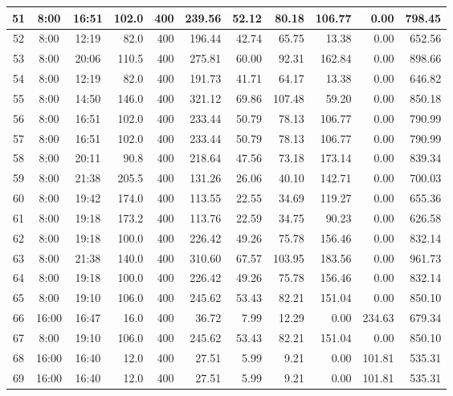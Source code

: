 \begin{landscape}
\begin{longtable}{|c|c|c|r|r|r|r|r|r|r|r|}
\hline
\rowcolor{gray!8}
51 & 8:00 & 16:51 & 102.0 & 400 & 239.56 & 52.12 & 80.18 & 106.77 & 0.00 & 798.45 \\
\hline
52 & 8:00 & 12:19 & 82.0 & 400 & 196.44 & 42.74 & 65.75 & 13.38 & 0.00 & 652.56 \\
\hline
\rowcolor{gray!8}
53 & 8:00 & 20:06 & 110.5 & 400 & 275.81 & 60.00 & 92.31 & 162.84 & 0.00 & 898.66 \\
\hline
54 & 8:00 & 12:19 & 82.0 & 400 & 191.73 & 41.71 & 64.17 & 13.38 & 0.00 & 646.82 \\
\hline
\rowcolor{gray!8}
55 & 8:00 & 14:50 & 146.0 & 400 & 321.12 & 69.86 & 107.48 & 59.20 & 0.00 & 850.18 \\
\hline
56 & 8:00 & 16:51 & 102.0 & 400 & 233.44 & 50.79 & 78.13 & 106.77 & 0.00 & 790.99 \\
\hline
\rowcolor{gray!8}
57 & 8:00 & 16:51 & 102.0 & 400 & 233.44 & 50.79 & 78.13 & 106.77 & 0.00 & 790.99 \\
\hline
58 & 8:00 & 20:11 & 90.8 & 400 & 218.64 & 47.56 & 73.18 & 173.14 & 0.00 & 839.34 \\
\hline
\rowcolor{gray!8}
59 & 8:00 & 21:38 & 205.5 & 400 & 131.26 & 26.06 & 40.10 & 142.71 & 0.00 & 700.03 \\
\hline
60 & 8:00 & 19:42 & 174.0 & 400 & 113.55 & 22.55 & 34.69 & 119.27 & 0.00 & 655.36 \\
\hline
\rowcolor{gray!8}
61 & 8:00 & 19:18 & 173.2 & 400 & 113.76 & 22.59 & 34.75 & 90.23 & 0.00 & 626.58 \\
\hline
62 & 8:00 & 19:18 & 100.0 & 400 & 226.42 & 49.26 & 75.78 & 156.46 & 0.00 & 832.14 \\
\hline
\rowcolor{gray!8}
63 & 8:00 & 21:38 & 140.0 & 400 & 310.60 & 67.57 & 103.95 & 183.56 & 0.00 & 961.73 \\
\hline
64 & 8:00 & 19:18 & 100.0 & 400 & 226.42 & 49.26 & 75.78 & 156.46 & 0.00 & 832.14 \\
\hline
\rowcolor{gray!8}
65 & 8:00 & 19:10 & 106.0 & 400 & 245.62 & 53.43 & 82.21 & 151.04 & 0.00 & 850.10 \\
\hline
66 & 16:00 & 16:47 & 16.0 & 400 & 36.72 & 7.99 & 12.29 & 0.00 & 234.63 & 679.34 \\
\hline
\rowcolor{gray!8}
67 & 8:00 & 19:10 & 106.0 & 400 & 245.62 & 53.43 & 82.21 & 151.04 & 0.00 & 850.10 \\
\hline
68 & 16:00 & 16:40 & 12.0 & 400 & 27.51 & 5.99 & 9.21 & 0.00 & 101.81 & 535.31 \\
\hline
\rowcolor{gray!8}
69 & 16:00 & 16:40 & 12.0 & 400 & 27.51 & 5.99 & 9.21 & 0.00 & 101.81 & 535.31 \\

\end{longtable}
\end{landscape}
